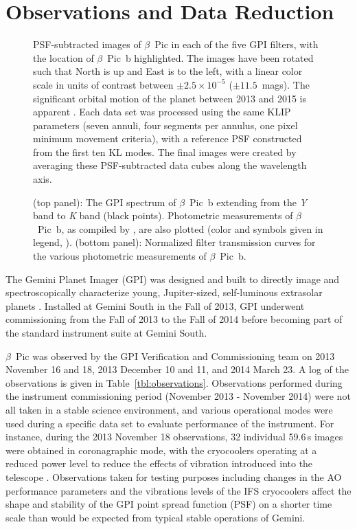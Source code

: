 \documentclass[twocolumn]{aastex6}
\begin{document}
\section{Observations and Data Reduction}
\label{sec:obs_data_reduction}
\begin{figure*}
\caption{PSF-subtracted images of $\beta$~Pic in each of the five GPI filters, with the location of $\beta$~Pic~b highlighted. The images have been rotated such that North is up and East is to the left, with a linear color scale in units of contrast between $\pm2.5\times10^{-5}$ ($\pm11.5$~mags). The significant orbital motion of the planet between 2013 and 2015 is apparent \citep{wang2016}. Each data set was processed using the same KLIP parameters (seven annuli, four segments per annulus, one pixel minimum movement criteria), with a reference PSF constructed from the first ten KL modes. The final images were created by averaging these PSF-subtracted data cubes along the wavelength axis.\label{fig:image_gallery}}
\end{figure*}
\begin{figure*}
\caption{(top panel): The GPI spectrum of $\beta$~Pic~b extending from the {\it Y} band to {\it K} band (black points). Photometric measurements of $\beta$~Pic~b, as compiled by \citet{Morzinski2015}, are also plotted (color and symbols given in legend, \citealp{Lagrange2009,Quanz2010,Bonnefoy2011,Currie2011b,Bonnefoy2013,Currie2013,Absil2013,Males2014,Morzinski2015}). (bottom panel): Normalized filter transmission curves for the various photometric measurements of $\beta$~Pic~b.}
\label{fig:SED}
\end{figure*}

The Gemini Planet Imager (GPI) was designed and built to directly image and spectroscopically characterize young, Jupiter-sized, self-luminous extrasolar planets \citep{Macintosh2006,Graham2007}. Installed at Gemini South in the Fall of 2013, GPI underwent commissioning from the Fall of 2013 to the Fall of 2014 before becoming part of the standard instrument suite at Gemini South.

$\beta$~Pic was observed by the GPI Verification and Commissioning team on 2013 November 16 and 18, 2013 December 10 and 11, and 2014 March 23. A log of the observations is given in Table~\ref{tbl:observations}. Observations performed during the instrument commissioning period (November 2013 - November 2014) were not all taken in a stable science environment, and various operational modes were used during a specific data set to evaluate performance of the instrument. For instance, during the 2013 November 18 observations, 32 individual 59.6\,s images were obtained in coronagraphic mode, with the cryocoolers operating at a reduced power level to reduce the effects of vibration introduced into the telescope \citep{Chilcote2012,Larkin2014}.
Observations taken for testing purposes including changes in the AO performance parameters and the vibrations levels of the IFS cryocoolers affect the shape and stability of the GPI point spread function (PSF) on a shorter time scale than would be expected from typical stable operations of Gemini.
\end{document}
